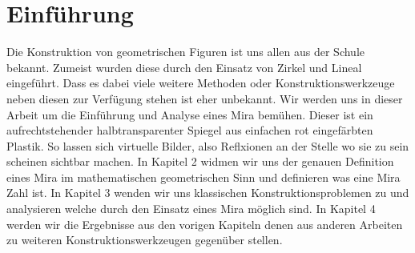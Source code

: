 \chapter{Einführung}

Die Konstruktion von geometrischen Figuren ist uns allen aus der Schule bekannt.
Zumeist wurden diese durch den Einsatz von Zirkel und Lineal eingeführt.
Dass es dabei viele weitere Methoden oder Konstruktionswerkzeuge neben diesen zur Verfügung stehen ist eher unbekannt.
Wir werden uns in dieser Arbeit um die Einführung und Analyse eines Mira bemühen. 
Dieser ist ein aufrechtstehender halbtransparenter Spiegel aus einfachen rot eingefärbten Plastik.
So lassen sich virtuelle Bilder, also Reflxionen an der Stelle wo sie zu sein scheinen sichtbar machen.
In Kapitel 2 widmen wir uns der genauen Definition eines Mira im mathematischen geometrischen Sinn und definieren was eine Mira Zahl ist.
In Kapitel 3 wenden wir uns klassischen Konstruktionsproblemen zu und analysieren welche durch den Einsatz eines Mira möglich sind.
In Kapitel 4 werden wir die Ergebnisse aus den vorigen Kapiteln denen aus anderen Arbeiten zu weiteren Konstruktionswerkzeugen gegenüber stellen.